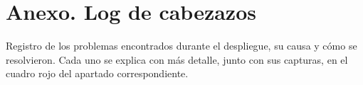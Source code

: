 
\newpage
\section*{Anexo. Log de cabezazos}
\label{sec:cabezazos}

Registro de los problemas encontrados durante el despliegue, su causa y cómo se
resolvieron. Cada uno se explica con más detalle, junto con sus capturas, en el cuadro rojo del apartado correspondiente.

